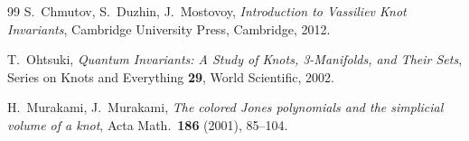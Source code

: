 \documentclass[12pt,a4paper]{amsart}
\theoremstyle{definition}
\begin{document}
\begin{thebibliography}{99}
S.\ Chmutov, S.\ Duzhin, J.\ Mostovoy,
\textit{Introduction to Vassiliev Knot Invariants},
Cambridge University Press, Cambridge, 2012.

T.\ Ohtsuki,
\textit{Quantum Invariants: A Study of Knots, 3-Manifolds, and Their Sets},
Series on Knots and Everything \textbf{29}, World Scientific, 2002.

H.\ Murakami, J.\ Murakami,
\textit{The colored Jones polynomials and the simplicial volume of a knot},
Acta Math.\ \textbf{186} (2001), 85--104.

\end{thebibliography}
\end{document}
